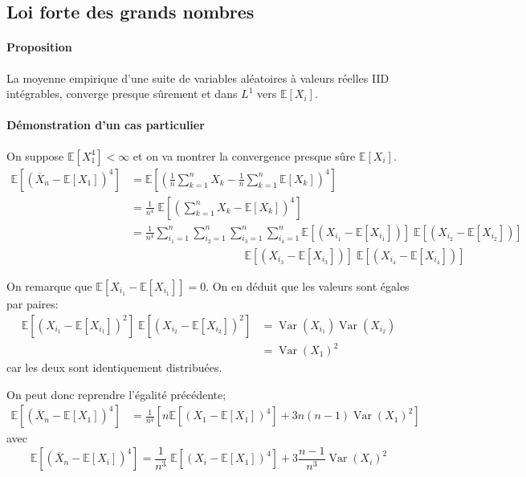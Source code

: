\documentclass[a4paper,10pt,french,openany]{memoir}
\newcommand{\Esper}{\mathbb{E}}
\DeclareMathOperator{\Var}{Var}
\begin{document}
\subsection{Loi forte des grands nombres}

\paragraph{Proposition}
La moyenne empirique d'une suite de variables aléatoires à valeurs réelles IID intégrables, converge presque sûrement et dans $L^1$ vers $\Esper[X_i]$.

\paragraph{Démonstration d'un cas particulier}
On suppose $\Esper[X_1^4]<\infty$ et on va montrer la convergence presque sûre $\Esper[X_i]$.
\begin{align*}
 \Esper\left[(\overline X_n - \Esper[X_1])^4\right] &= \Esper\left[\left(\frac 1 n \sum_{k=1}^n X_k - \frac 1 n \sum_{k=1}^n \Esper[X_k]\right)^4\right] \\
 &= \frac 1 {n^4}\;\Esper\left[\left(\sum_{k=1}^n X_k - \Esper[X_k]\right)^4\right] \\
 &= \frac 1 {n^4} \sum_{i_1 = 1}^n \sum_{i_2 = 1}^n \sum_{i_3 = 1}^n \sum_{i_4 = 1}^n \Esper[(X_{i_1}-\Esper[X_{i_1}])]\; \Esper[(X_{i_2}-\Esper[X_{i_2}])] \\ &\qquad\qquad\qquad\qquad\qquad\, \Esper[(X_{i_3}-\Esper[X_{i_3}])]\; \Esper[(X_{i_4}-\Esper[X_{i_4}])]
\end{align*}

On remarque que $\Esper[X_{i_1} - \Esper[X_{i_1}]] = 0$. On en déduit que les valeurs sont égales par paires:
\begin{align*}
 \Esper\left[(X_{i_1} - \Esper[X_{i_1}])^2\right]\;\Esper\left[(X_{i_2} - \Esper[X_{i_2}])^2\right] &= \Var(X_{i_1}) \Var(X_{i_2}) \\
 &= \Var(X_1)^2
\end{align*}
car les deux sont identiquement distribuées.

On peut donc reprendre l'égalité précédente;
\begin{align*}
 \Esper\left[(\overline X_n - \Esper[X_1])^4\right] &= \frac 1 {n^4} \left[n \Esper\left[(X_1 - \Esper[X_1])^4\right] + 3 n (n-1) \Var(X_1)^2\right]
\end{align*}
avec \[ \Esper\left[(\overline X_n - \Esper[X_i])^4\right] = \frac 1 {n^3}\; \Esper\left[(X_i - \Esper[X_1])^4\right] + 3 \frac{n-1}{n^3} \Var(X_i)^2 \]
\end{document}
